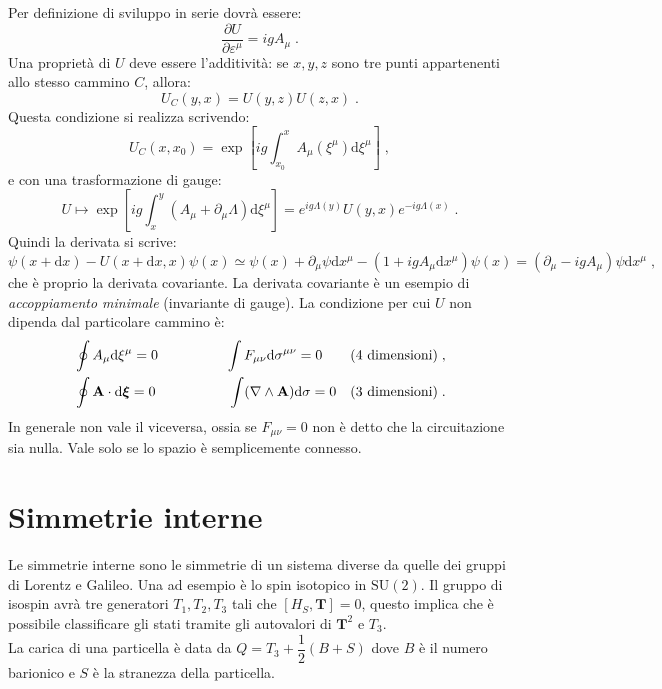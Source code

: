 \documentclass[12pt,a4paper]{report}
\theoremstyle{definition}
\numberwithin{equation}{section}
\newcommand{\diff}[1][]{\mathrm{d}#1}
\begin{document}
Per definizione di sviluppo in serie dovrà essere:
\begin{equation}
\frac{\partial U}{\partial \varepsilon^{\mu}}=igA_{\mu}\;.
\end{equation}
Una proprietà di $U$ deve essere l'additività: se $x,y,z$ sono tre punti appartenenti allo stesso cammino $C$, allora:
$$
U_C(y,x)=U(y,z)U(z,x)\;.
$$
Questa condizione si realizza scrivendo:
\begin{equation}
U_C(x,x_0)=\exp\left[ig\int_{x_0}^x A_{\mu}(\xi^{\mu})\diff{\xi^{\mu}}\right]\;,
\end{equation}
e con una trasformazione di gauge:
\begin{equation}
U\longmapsto \exp\left[ig\int_x^y(A_{\mu}+\partial_{\mu}\Lambda)\diff{\xi^{\mu}}\right]=e^{ig\Lambda(y)}U(y,x)e^{-ig\Lambda(x)}\;.
\end{equation}
Quindi la derivata si scrive:
\begin{equation*}
\psi(x+\diff{x})-U(x+\diff{x},x)\psi(x)\simeq \psi(x)+\partial_{\mu}\psi\diff{x^{\mu}}-(1+igA_{\mu}\diff{x^{\mu}})\psi(x)=(\partial_{\mu}-igA_{\mu})\psi\diff{x^{\mu}}\;,
\end{equation*}
che è proprio la derivata covariante. La derivata covariante è un esempio di \textit{accoppiamento minimale} (invariante di gauge). La condizione per cui $U$ non dipenda dal particolare cammino è:
\begin{align}
&\oint A_{\mu}\diff{\xi^{\mu}}=0 \qquad &\qquad \int F_{\mu\nu}\diff{\sigma^{\mu\nu}}=0\qquad \mbox{(4 dimensioni)} \;,\notag \\
&\oint \mathbf{A}\cdot\diff{\boldsymbol{\xi}}=0 \qquad &\qquad \int (\nabla\wedge\mathbf{A})\diff{\sigma}=0 \quad \mbox{(3 dimensioni)}\;.
\end{align}
In generale non vale il viceversa, ossia se $F_{\mu\nu}=0$ non è detto che la circuitazione sia nulla. Vale solo se lo spazio è semplicemente connesso.
\section{Simmetrie interne}
Le simmetrie interne sono le simmetrie di un sistema diverse da quelle dei gruppi di Lorentz e Galileo. Una ad esempio è lo spin isotopico in $\mathrm{SU}(2)$. Il gruppo di isospin avrà tre generatori $T_1,T_2,T_3$ tali che $[H_S,\mathbf{T}]=0$, questo implica che è possibile classificare gli stati tramite gli autovalori di $\mathbf{T}^2$ e $T_3$. \\
La carica di una particella è data da $Q=T_3+\dfrac{1}{2}(B+S)$ dove $B$ è il numero barionico e $S$ è la stranezza della particella.
\end{document}
